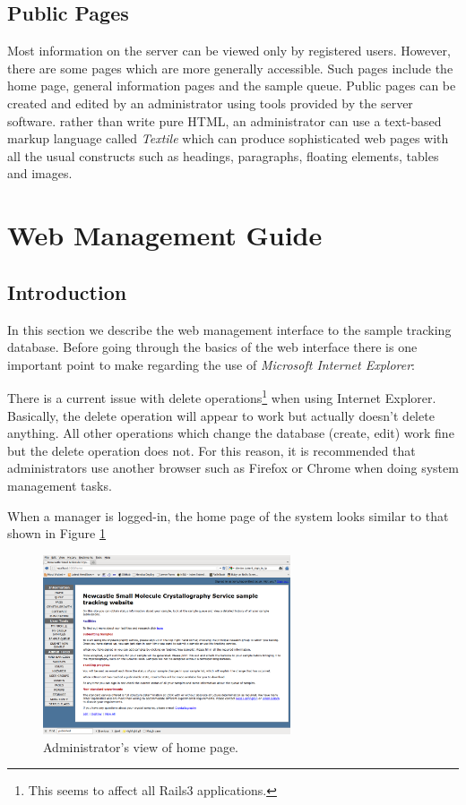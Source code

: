 \documentclass[12pt,twoside]{article}
\begin{document}
\subsection{Public Pages}
Most information on the server can be viewed only by registered users.
However, there are some pages which are more generally accessible.
Such pages include the home page, general information pages and
the sample queue. Public pages can be created and edited by an administrator
using tools provided by the server software. rather than write pure
HTML, an administrator can use a text-based markup language called
\emph{Textile}\cite{textile}
which can produce sophisticated web pages with all the usual constructs
such as headings, paragraphs, floating elements, tables and images.

\section{Web Management Guide}
\subsection{Introduction}
In this section we describe the web management interface to the
sample tracking database. 
Before going through the basics of the web interface there is one
important point to make regarding the use of 
\emph{Microsoft Internet Explorer}:

\begin{plainblock}
There is a current issue with delete operations\footnote{This seems to affect
all Rails3 applications.} when using 
Internet Explorer. Basically, the delete operation will appear to work
but actually doesn't delete anything. All other operations which change the
database (create, edit) work fine but the delete operation does not.
For this reason, it is recommended that administrators use another browser
such as Firefox or Chrome when doing system management tasks.
\end{plainblock}

When a manager is logged-in, the home page of
the system looks similar to that shown in Figure \ref{fig:homepage}

\begin{figure}[!htb]
\begin{center}
\includegraphics[width=0.65\textwidth]{homepage}
\caption{Administrator's view of home page.\label{fig:homepage}}
\end{center}
\end{figure}
\end{document}
